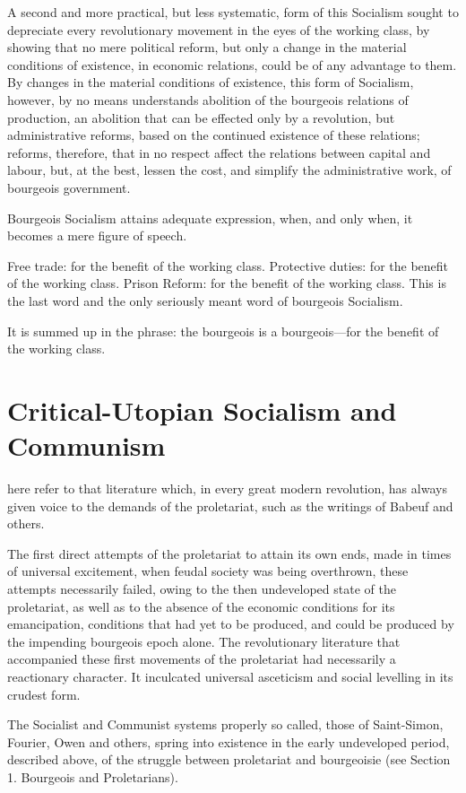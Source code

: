 A second and more practical, but less systematic, form of this
Socialism sought to depreciate every revolutionary movement in the eyes
of the working class, by showing that no mere political reform, but
only a change in the material conditions of existence, in economic
relations, could be of any advantage to them. By changes in the
material conditions of existence, this form of Socialism, however, by
no means understands abolition of the bourgeois relations of
production, an abolition that can be effected only by a revolution, but
administrative reforms, based on the continued existence of these
relations; reforms, therefore, that in no respect affect the relations
between capital and labour, but, at the best, lessen the cost, and
simplify the administrative work, of bourgeois government.

Bourgeois Socialism attains adequate expression, when, and only when,
it becomes a mere figure of speech.

Free trade: for the benefit of the working class. Protective duties:
for the benefit of the working class. Prison Reform: for the benefit of
the working class. This is the last word and the only seriously meant
word of bourgeois Socialism.

It is summed up in the phrase: the bourgeois is a bourgeois—for the
benefit of the working class.

\section*{Critical-Utopian Socialism and Communism}

 here refer to that literature which, in every great modern
revolution, has always given voice to the demands of the proletariat,
such as the writings of Babeuf and others.

The first direct attempts of the proletariat to attain its own ends,
made in times of universal excitement, when feudal society was being
overthrown, these attempts necessarily failed, owing to the then
undeveloped state of the proletariat, as well as to the absence of the
economic conditions for its emancipation, conditions that had yet to be
produced, and could be produced by the impending bourgeois epoch alone.
The revolutionary literature that accompanied these first movements of
the proletariat had necessarily a reactionary character. It inculcated
universal asceticism and social levelling in its crudest form.

The Socialist and Communist systems properly so called, those of
Saint-Simon, Fourier, Owen and others, spring into existence in the
early undeveloped period, described above, of the struggle between
proletariat and bourgeoisie (see Section 1. Bourgeois and
Proletarians).

